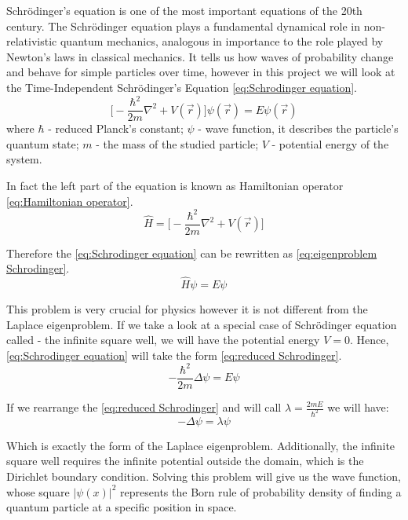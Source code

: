\documentclass[acmsmall,screen]{MapleTrans}
\begin{document}
Schr\"{o}dinger's equation is one of the most important equations of the 20th century. The Schr\"{o}dinger equation plays a fundamental dynamical role in non-relativistic quantum mechanics, analogous in importance to the role played by Newton's laws in classical mechanics. It tells us how waves of probability change and behave for simple particles over time, however in this project we will look at the Time-Independent Schr\"{o}dinger's Equation \eqref{eq:Schrodinger equation}.
\begin{equation}
    \Bigg[-\frac{\hbar^2}{2m}\nabla^2 + V(\vec{r})\Bigg]\psi({\vec{r}}) = E\psi(\vec{r})
    \label{eq:Schrodinger equation}
\end{equation}
where $\hbar$ - reduced Planck's constant; $\psi$ - wave function, it describes the particle's quantum state; $m$ - the mass of the studied particle; $V$ - potential energy of the system.

In fact the left part of the equation is known as Hamiltonian operator \eqref{eq:Hamiltonian operator}.
\begin{equation}
    \hat{H} = \Bigg[-\frac{\hbar^2}{2m}\nabla^2 + V(\vec{r})\Bigg]
    \label{eq:Hamiltonian operator}
\end{equation}

Therefore the \eqref{eq:Schrodinger equation} can be rewritten as \eqref{eq:eigenproblem Schrodinger}.
\begin{equation}
    \hat{H}\psi = E\psi
    \label{eq:eigenproblem Schrodinger}
\end{equation}

This problem is very crucial for physics however it is not different from the Laplace eigenproblem. If we take a look at a special case of Schr\"{o}dinger equation called - the infinite square well, we will have the potential energy $V = 0$. 
Hence, \eqref{eq:Schrodinger equation} will take the form \eqref{eq:reduced Schrodinger}.
\begin{equation}
    -\frac{\hbar^2}{2m}\Delta\psi = E\psi
    \label{eq:reduced Schrodinger}
\end{equation}

If we rearrange the \eqref{eq:reduced Schrodinger} and will call $\lambda = \frac{2mE}{\hbar^2}$ we will have:
\begin{equation}
    -\Delta\psi = \lambda\psi
\end{equation}

Which is exactly the form of the Laplace eigenproblem. Additionally, the infinite square well requires the infinite potential outside the domain, which is the Dirichlet boundary condition.
Solving this problem will give us the wave function, whose square $|\psi(x)|^2$ represents the Born rule of probability density of finding a quantum particle at a specific position in space.
\end{document}
